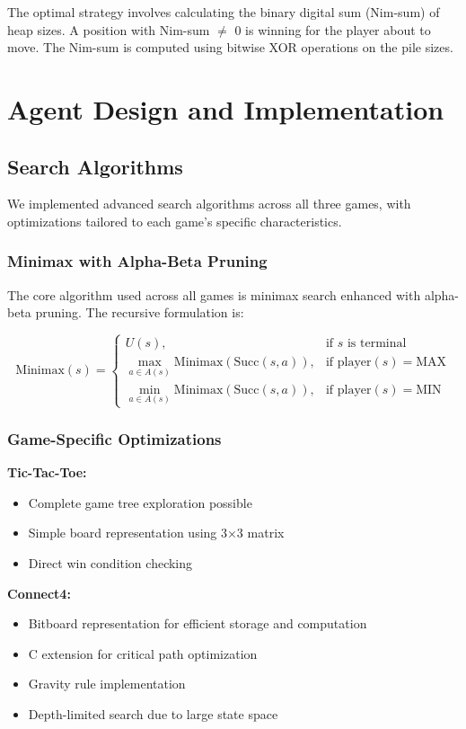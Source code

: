 \documentclass[12pt]{article}
\begin{document}
The optimal strategy involves calculating the binary digital sum (Nim-sum) of heap sizes. A position with Nim-sum $\neq$ 0 is winning for the player about to move. The Nim-sum is computed using bitwise XOR operations on the pile sizes.

\section{Agent Design and Implementation}

\subsection{Search Algorithms}

We implemented advanced search algorithms across all three games, with optimizations tailored to each game's specific characteristics.

\subsubsection{Minimax with Alpha-Beta Pruning}

The core algorithm used across all games is minimax search enhanced with alpha-beta pruning. The recursive formulation is:

\[
\text{Minimax}(s) =
\begin{cases}
U(s), & \text{if } s \text{ is terminal} \\
\max_{a \in A(s)} \text{Minimax}(\text{Succ}(s, a)), & \text{if } \text{player}(s) = \text{MAX} \\
\min_{a \in A(s)} \text{Minimax}(\text{Succ}(s, a)), & \text{if } \text{player}(s) = \text{MIN}
\end{cases}
\]

\subsubsection{Game-Specific Optimizations}

\textbf{Tic-Tac-Toe:}
\begin{itemize}
    \item Complete game tree exploration possible
    \item Simple board representation using 3×3 matrix
    \item Direct win condition checking
\end{itemize}

\textbf{Connect4:}
\begin{itemize}
    \item Bitboard representation for efficient storage and computation
    \item C extension for critical path optimization
    \item Gravity rule implementation
    \item Depth-limited search due to large state space
\end{itemize}
\end{document}
